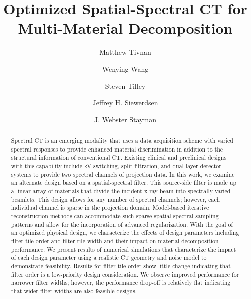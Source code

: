 \documentclass[12pt]{spieman}  %
\title{Optimized Spatial-Spectral CT for Multi-Material Decomposition\vspace{-1em}}
\author{Matthew Tivnan}
\author{Wenying Wang}
\author{Steven Tilley}
\author{Jeffrey H.  Siewerdsen}
\author{J. Webster Stayman}
\affil{Department of Biomedical Engineering, Johns Hopkins University, 720 Rutland Ave., Baltimore MD 21205}
\begin{document}
 

\maketitle

\vspace{-8mm}

\begin{abstract}
Spectral CT is an emerging modality that uses a data acquisition scheme with varied spectral responses to provide enhanced material discrimination in addition to the structural information of conventional CT. Existing clinical and preclinical designs with this capability include kV-switching, split-filtration, and dual-layer detector systems to provide two spectral channels of projection data. In this work, we examine an alternate design based on a spatial-spectral filter. This source-side filter is made up a linear array of materials that divide the incident x-ray beam into spectrally varied beamlets. This design allows for any number of spectral channels; however, each individual channel is sparse in the projection domain. Model-based iterative reconstruction methods can accommodate such sparse spatial-spectral sampling patterns and allow for the incorporation of advanced regularization. With the goal of an optimized physical design, we characterize the effects of design parameters including filter tile order and filter tile width and their impact on material decomposition performance. We present results of numerical simulations that characterize the impact of each design parameter using a realistic CT geometry and noise model to demonstrate feasibility. Results for filter tile order show little change indicating that filter order is a low-priority design consideration. We observe improved performance for narrower filter widths; however, the performance drop-off is relatively flat indicating that wider filter widths are also feasible designs.
\end{abstract}
\end{document}

